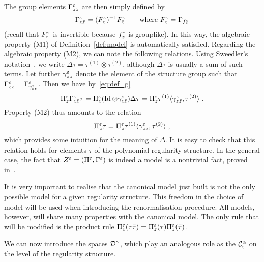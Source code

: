 \documentclass[reqno,11pt]{article}
\DeclareMathOperator{\Id}{Id}
\def\fraks{\mathfrak{s}}
\begin{document}
The group elements $\Gamma^\varepsilon_{z\bar z}$ are then simply defined by 
\begin{equation}
 \label{eq:Gamma_F}
 \Gamma^\eps_{z\bar z} = (F^\eps_z)^{-1} F^\eps_{\bar z}
 \qquad 
 \text{where $F^\eps_z = \Gamma_{f^\eps_z}$}
\end{equation} 
(recall that $F^\varepsilon_z$ is invertible because $f^\varepsilon_z$ is grouplike). In this
way, the algebraic property (M1) of Definition~\ref{def:model} is automatically
satisfied. Regarding the algebraic property (M2), we can note the following
relations. Using Sweedler's notation~\cite{Sweedler69}, we write $\Delta\tau =
\tau^{(1)}\otimes\tau^{(2)}$, although $\Delta\tau$ is usually a sum of such
terms. Let further $\gamma^\varepsilon_{z\bar z}$ denote the element of the structure
group such that $\Gamma^\varepsilon_{z\bar z} = \Gamma^\varepsilon_{\gamma^\varepsilon_{z\bar z}}$.
Then we have by~\eqref{eq:def_g}
\begin{equation}
 \label{eq:Gamma_F01}
 \Pi^\eps_z \Gamma^\eps_{z\bar z}\tau = \Pi^\eps_z (\Id\otimes\gamma^\eps_{z\bar
z})\Delta\tau
 = \Pi^\eps_z\tau^{(1)} \pscal{\gamma^\eps_{z\bar z}}{\tau^{(2)}}\;.
\end{equation} 
Property (M2) thus amounts to the relation
\begin{equation}
 \label{eq:Gamma_F02}
 \Pi^\eps_{\bar z}\tau = \Pi^\eps_z\tau^{(1)} \pscal{\gamma^\eps_{z\bar
z}}{\tau^{(2)}}\;,
\end{equation} 
which provides some intuition for the meaning of $\Delta$. 
It is easy to check that this relation holds for elements $\tau$ of the
polynomial regularity structure. In the general case, the fact that
$Z^\varepsilon=(\Pi^\varepsilon,\Gamma^\varepsilon)$ is indeed a model is a nontrivial
fact, proved in~\cite[Prop.~8.27]{Hairer2014}. 

\begin{remark}
\label{rem:model_canonical}
It is very important to realise that the canonical model just built is not the
only possible model for a given regularity structure. This freedom in the
choice of model will be used when introducing the renormalisation procedure.
All models, however, will share many properties with the canonical model. The
only rule that will be modified is the product rule $\Pi^\varepsilon_z(\tau\bar\tau) =
\Pi^\varepsilon_z(\tau)\Pi^\varepsilon_z(\bar \tau)$. 
\end{remark}

We can now introduce the spaces ${\mathcal D}^\gamma$, which play an analogous role as
the $\cC^\alpha_\fraks$ on the level of the regularity structure. 
\end{document}
